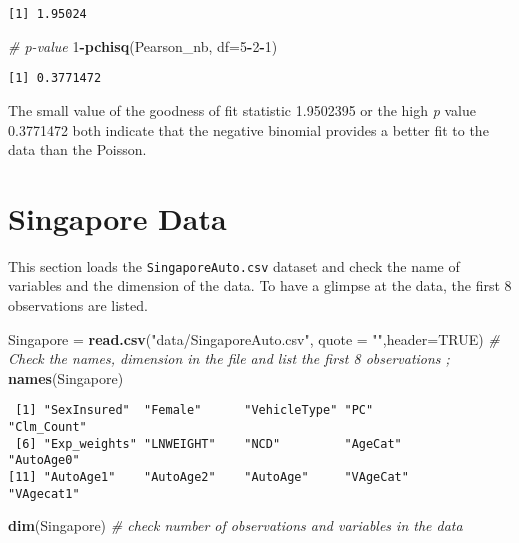 \documentclass[]{book}
\newenvironment{Shaded}{\begin{snugshade}}{\end{snugshade}}
\newcommand{\KeywordTok}[1]{\textcolor[rgb]{0.13,0.29,0.53}{\textbf{#1}}}
\newcommand{\DataTypeTok}[1]{\textcolor[rgb]{0.13,0.29,0.53}{#1}}
\newcommand{\DecValTok}[1]{\textcolor[rgb]{0.00,0.00,0.81}{#1}}
\newcommand{\StringTok}[1]{\textcolor[rgb]{0.31,0.60,0.02}{#1}}
\newcommand{\CommentTok}[1]{\textcolor[rgb]{0.56,0.35,0.01}{\textit{#1}}}
\newcommand{\OtherTok}[1]{\textcolor[rgb]{0.56,0.35,0.01}{#1}}
\newcommand{\OperatorTok}[1]{\textcolor[rgb]{0.81,0.36,0.00}{\textbf{#1}}}
\newcommand{\NormalTok}[1]{#1}
\theoremstyle{definition}
\theoremstyle{definition}
\theoremstyle{definition}
\theoremstyle{remark}
\begin{document}
\begin{verbatim}
[1] 1.95024
\end{verbatim}

\begin{Shaded}
\begin{Highlighting}[]
\CommentTok{#  p-value}
\DecValTok{1}\OperatorTok{-}\KeywordTok{pchisq}\NormalTok{(Pearson_nb, }\DataTypeTok{df=}\DecValTok{5}\OperatorTok{-}\DecValTok{2}\OperatorTok{-}\DecValTok{1}\NormalTok{)}
\end{Highlighting}
\end{Shaded}

\begin{verbatim}
[1] 0.3771472
\end{verbatim}

The small value of the goodness of fit statistic 1.9502395 or the high
\emph{p} value 0.3771472 both indicate that the negative binomial
provides a better fit to the data than the Poisson.

\section{Singapore Data}\label{singapore-data-1}

This section loads the \texttt{SingaporeAuto.csv} dataset and check the
name of variables and the dimension of the data. To have a glimpse at
the data, the first 8 observations are listed.

\begin{Shaded}
\begin{Highlighting}[]
\NormalTok{Singapore =}\StringTok{ }\KeywordTok{read.csv}\NormalTok{(}\StringTok{"data/SingaporeAuto.csv"}\NormalTok{,  }\DataTypeTok{quote =} \StringTok{""}\NormalTok{,}\DataTypeTok{header=}\OtherTok{TRUE}\NormalTok{)}
\CommentTok{#  Check the names, dimension in the file and list the first 8 observations ;}
\KeywordTok{names}\NormalTok{(Singapore)}
\end{Highlighting}
\end{Shaded}

\begin{verbatim}
 [1] "SexInsured"  "Female"      "VehicleType" "PC"          "Clm_Count"  
 [6] "Exp_weights" "LNWEIGHT"    "NCD"         "AgeCat"      "AutoAge0"   
[11] "AutoAge1"    "AutoAge2"    "AutoAge"     "VAgeCat"     "VAgecat1"   
\end{verbatim}

\begin{Shaded}
\begin{Highlighting}[]
\KeywordTok{dim}\NormalTok{(Singapore)  }\CommentTok{# check number of observations and variables in the data}
\end{Highlighting}
\end{Shaded}
\end{document}
